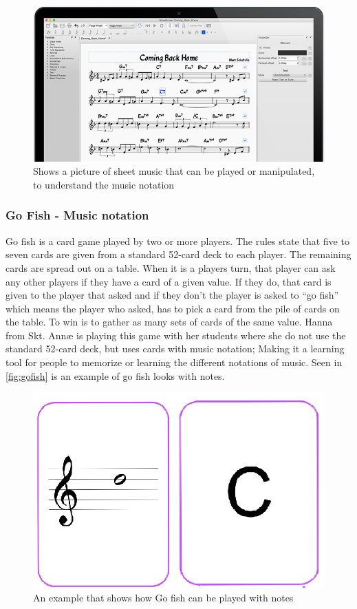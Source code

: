 \begin{figure}[H]
	\centering
	\includegraphics[width=0.8\linewidth]{figure/Analysis/musescore.png}
	\caption{Shows a picture of sheet music that can be played or manipulated, to understand the music notation}
	\label{fig:MuseScore}
\end{figure}

\subsubsection{Go Fish - Music notation} 
Go fish is a card game played by two or more players. The rules state that five to seven cards are given from a standard 52-card deck to each player. The remaining cards are spread out on a table. When it is a players turn, that player can ask any other players if they have a card of a given value. If they do, that card is given to the player that asked and if they don’t the player is asked to “go fish” which means the player who asked, has to pick a card from the pile of cards on the table. To win is to gather as many sets of cards of the same value. Hanna from Skt. Annæ is playing this game with her students where she do not use the standard 52-card deck, but uses cards with music notation; Making it a learning tool for people to memorize or learning the different notations of music. Seen in \autoref{fig:gofish} is an example of go fish looks with notes.

\begin{figure}[H]
	\centering
	\includegraphics[width=0.7\linewidth]{figure/Analysis/gofish}
	\caption{An example that shows how Go fish can be played with notes}
	\label{fig:gofish}
\end{figure}

